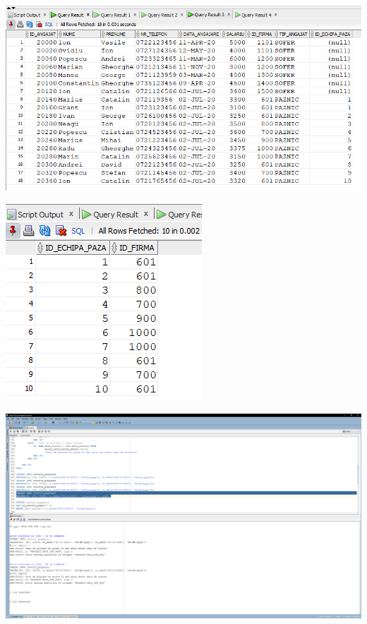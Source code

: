 \documentclass[12pt, a4paper]{article}
\begin{document}
\includegraphics[width=\textwidth]{10_11.png}

\includegraphics[width=\textwidth]{10_12.png}

\includegraphics[width=\textwidth]{11_1.png}
\end{document}
